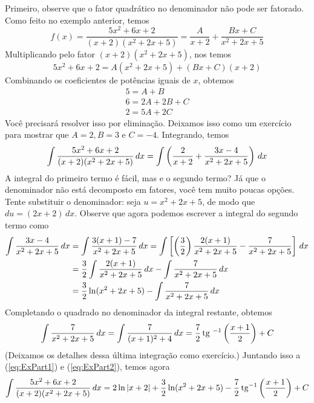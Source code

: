 \cleardoublepage\documentclass[../main.tex]{subfiles}
\begin{document}
\begin{ex}
\begin{compactenum}[a)]
\begin{sol}
Primeiro, observe que o fator quadrático no denominador não pode ser fatorado. Como feito no exemplo anterior, temos 
\begin{equation*}
f(x)=\frac{5x^2+6x+2}{(x+2)(x^2+2x+5)}=\frac{A}{x+2}+\frac{Bx+C}{x^2+2x+5}
\end{equation*}
Multiplicando pelo fator $(x+2)(x^2+2x+5)$, nos temos
\begin{equation*}
5x^2+6x+2=A(x^2+2x+5)+(Bx+C)(x+2)
\end{equation*}
Combinando os coeficientes de potências iguais de $x$, obtemos
\begin{align*}
5=A+B\\
6=2A+2B+C\\
2=5A+2C
\end{align*}
Você precisará resolver isso por eliminação. Deixamos isso como um exercício para mostrar que
$A = 2, B = 3$ e $C = -4$. Integrando, temos
\begin{equation}
\int \frac{5x^2+6x+2}{(x+2)(x^2+2x+5)}\, dx=\int \left(\frac{2}{x+2}+\frac{3x-4}{x^2+2x+5}\right)\, dx\label{eq:ExPart1}
\end{equation}
A integral do primeiro termo é fácil, mas e o segundo termo?  Já que o denominador não está decomposto em fatores, você tem muito poucas opções. Tente substituir o denominador: seja $u = x^2 + 2 x + 5$, de modo que $du = (2x + 2)\, dx$. Observe que agora podemos escrever a integral do segundo termo como
\begin{align}
\int \frac{3x-4}{x^2+2x+5}\, dx&=\int \frac{3(x+1)-7}{x^2+2x+5}\, dx=\int \left[\left(\frac{3}{2}\right)\frac{2(x+1)}{x^2+2x+5}-\frac{7}{x^2+2x+5}\right]\, dx\nonumber\\
&=\frac{3}{2}\int \frac{2(x+1)}{x^2+2x+5}\, dx-\int \frac{7}{x^2+2x+5}\, dx\nonumber\\
&=\frac{3}{2}\ln (x^2+2x+5)-\int \frac{7}{x^2+2x+5}\, dx\label{eq:ExPart2}
\end{align}
Completando o quadrado no denominador da integral restante, obtemos
\begin{equation*}
\int \frac{7}{x^2+2x+5}\, dx=\int \frac{7}{(x+1)^2+4}\, dx=\frac{7}{2}\operatorname{tg}\,^{-1}\left(\frac{x+1}{2}\right)+C
\end{equation*}
(Deixamos os detalhes dessa última integração como  exercício.) Juntando isso a
(\ref{eq:ExPart1}) e (\ref{eq:ExPart2}), temos agora
\begin{equation*}
\int \frac{5x^2+6x+2}{(x+2)(x^2+2x+5)}\, dx=2\ln |x+2|+\frac{3}{2}\ln (x^2+2x+5)-\frac{7}{2}\operatorname{tg}\,\!\!^{-1}\left(\frac{x+1}{2}\right)+C
\end{equation*}

\end{sol}
\end{compactenum}
\end{ex}
\end{document}
